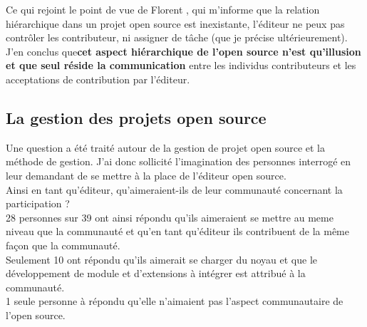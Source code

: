 			Ce qui rejoint le point de vue de Florent , qui m'informe que la relation hiérarchique dans un projet open source est inexistante, l'éditeur ne peux pas contrôler les contributeur, ni assigner de tâche (que je précise ultérieurement).\\

			J'en conclus que\textbf{cet aspect hiérarchique de l'open source n'est qu'illusion et que seul réside la communication} entre les individus contributeurs et les acceptations de contribution par l'éditeur.

		\subsection{La gestion des projets open source}

			Une question a été traité autour de la gestion de projet open source et la méthode de gestion.
			J'ai donc sollicité l'imagination des personnes interrogé en leur demandant de se mettre à la place de l'éditeur open source.\\

			Ainsi en tant qu'éditeur, qu'aimeraient-ils de leur communauté concernant la participation ?\\

			28 personnes sur 39 ont ainsi répondu qu'ils aimeraient se mettre au meme niveau que la communauté et qu'en tant qu'éditeur ils contribuent de la même façon que la communauté.\\

			Seulement 10 ont répondu qu'ils aimerait se charger du noyau et que le développement de module et d'extensions à intégrer est attribué à la communauté.\\

			1 seule personne à répondu qu'elle n'aimaient pas l'aspect communautaire de l'open source.

